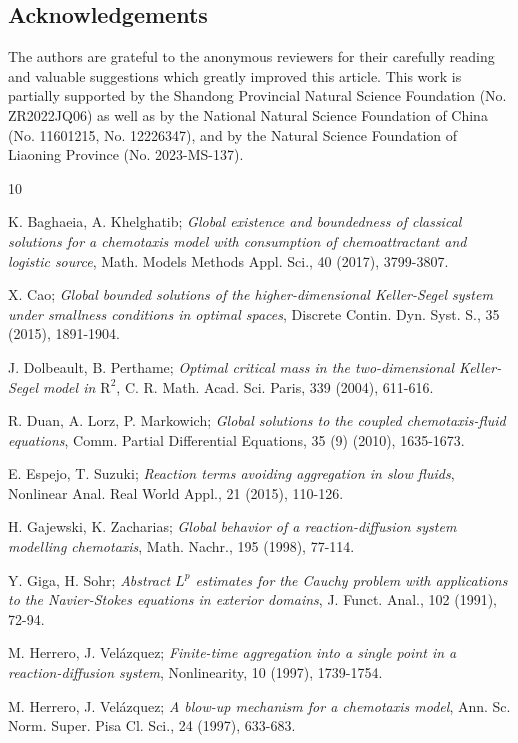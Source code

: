 \documentclass[reqno]{amsart}
\begin{document}
\subsection*{Acknowledgements}
The authors are  grateful to the anonymous
reviewers for their carefully reading and valuable suggestions which greatly 
improved this article. This work is partially supported by the
Shandong Provincial Natural Science Foundation
 (No. ZR2022JQ06) as well as by the National Natural
Science Foundation of China (No. 11601215, No. 12226347), and 
by the Natural Science Foundation of Liaoning Province (No. 2023-MS-137).

\begin{thebibliography}{10}

 K. Baghaeia, A. Khelghatib; 
\emph{Global existence and boundedness of classical solutions for a chemotaxis model with 
consumption of chemoattractant and logistic source},
 Math. Models Methods Appl. Sci., 40 (2017), 3799-3807.

 X. Cao; 
\emph{Global bounded solutions of the higher-dimensional Keller-Segel system under 
smallness conditions in optimal spaces}, 
Discrete Contin. Dyn. Syst. S., 35 (2015), 1891-1904.

 J. Dolbeault, B. Perthame;
\emph{Optimal critical mass in the two-dimensional Keller-Segel model in $\mathrm{R}^2$}, 
C. R. Math. Acad. Sci. Paris, 339 (2004), 611-616.

 R. Duan, A. Lorz, P. Markowich;
\emph{Global solutions to the coupled chemotaxis-fluid equations}, 
Comm. Partial Differential Equations, 35 (9) (2010), 1635-1673.

 E. Espejo, T. Suzuki;
\emph{Reaction terms avoiding aggregation in slow fluids}, 
Nonlinear Anal. Real World Appl., 21 (2015), 110-126.

 H. Gajewski, K. Zacharias;
\emph{Global behavior of a reaction-diffusion system modelling chemotaxis}, 
Math. Nachr., 195 (1998), 77-114.

 Y. Giga, H. Sohr;
\emph{Abstract $L^p$ estimates for the Cauchy problem with applications to the 
Navier-Stokes equations in exterior domains}, J. Funct. Anal., 102 (1991), 72-94.

 M. Herrero, J. Vel\'{a}zquez;
\emph{Finite-time aggregation into a single point in a reaction-diffusion system}, 
Nonlinearity, 10 (1997), 1739-1754.

 M. Herrero, J. Vel\'{a}zquez;
\emph{A blow-up mechanism for a chemotaxis model}, 
Ann. Sc. Norm. Super. Pisa Cl. Sci., 24 (1997), 633-683.


\end{thebibliography}
\end{document}
